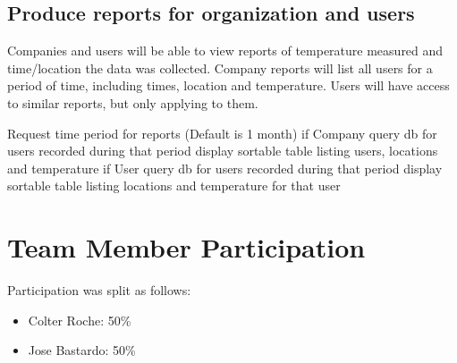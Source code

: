 \documentclass[12pt, letterpaper]{article}
\begin{document}
    \subsection{Produce reports for organization and users}
    Companies and users will be able to view reports of temperature measured and time/location the data was collected.
    Company reports will list all users for a period of time, including times, location and temperature.  Users will have
    access to similar reports, but only applying to them.
    \begin{algorithm}
        Request time period for reports (Default is 1 month)
        if Company
            query db for users recorded during that period
            display sortable table listing users, locations and temperature
        if User
            query db for users recorded during that period
            display sortable table listing locations and temperature for that user
    \end{algorithm}
    \section{Team Member Participation}
    Participation was split as follows:
    \begin{itemize}
        \item Colter Roche: 50\%
        \item Jose Bastardo: 50\%
    \end{itemize}
\end{document}
